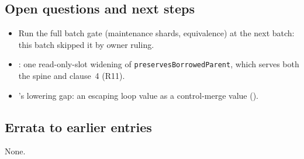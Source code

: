 \subsection*{Open questions and next steps}
\begin{itemize}
  \item Run the full batch gate (maintenance shards, equivalence) at the next batch: this
  batch skipped it by owner ruling.
  \item {}: one read-only-slot widening of
  \texttt{preservesBorrowedParent}, which serves both the spine and clause~4 (R11).
  \item {}'s lowering gap: an escaping loop value as a
  control-merge value ().
\end{itemize}

\subsection*{Errata to earlier entries}
None.
